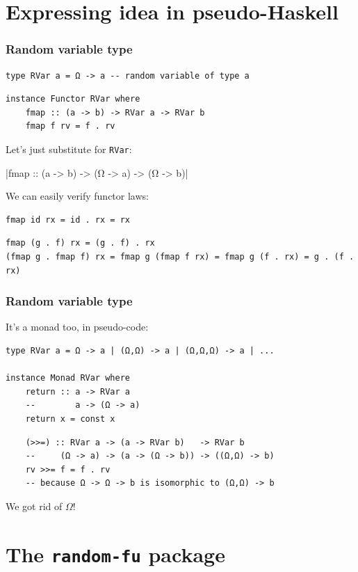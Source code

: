 \documentclass[mathserif, 8pt, handout]{beamer}
\begin{document}
\section{Expressing idea in pseudo-Haskell}

\begin{frame}[fragile]
  \frametitle{Random variable type}

\begin{verbatim}
type RVar a = Ω -> a -- random variable of type a
\end{verbatim}
  \pause
\begin{verbatim}
instance Functor RVar where
    fmap :: (a -> b) -> RVar a -> RVar b
    fmap f rv = f . rv
\end{verbatim}

\pause
  Let's just substitute for \verb|RVar|:

  |fmap :: (a -> b) -> (Ω -> a) -> (Ω -> b)|

  \pause
  We can easily verify functor laws:

\begin{verbatim}
fmap id rx = id . rx = rx
\end{verbatim}
  \pause
\begin{verbatim}
fmap (g . f) rx = (g . f) . rx
(fmap g . fmap f) rx = fmap g (fmap f rx) = fmap g (f . rx) = g . (f . rx)
\end{verbatim}
\end{frame}

\begin{frame}[fragile]
  \frametitle{Random variable type}
  It's a monad too, in pseudo-code:

\begin{verbatim}
type RVar a = Ω -> a | (Ω,Ω) -> a | (Ω,Ω,Ω) -> a | ...

instance Monad RVar where
    return :: a -> RVar a
    --        a -> (Ω -> a)
    return x = const x
\end{verbatim}
  \pause
\begin{verbatim}
    (>>=) :: RVar a -> (a -> RVar b)   -> RVar b
    --     (Ω -> a) -> (a -> (Ω -> b)) -> ((Ω,Ω) -> b)
    rv >>= f = f . rv
    -- because Ω -> Ω -> b is isomorphic to (Ω,Ω) -> b
\end{verbatim}
\pause
\alert{We got rid of $\Omega$!}

\end{frame}

\section{The \texttt{random-fu} package}
\end{document}

